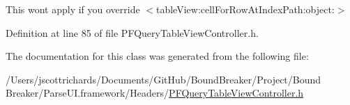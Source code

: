 This won\textquotesingle{}t apply if you override $<$table\+View\+:cell\+For\+Row\+At\+Index\+Path\+:object\+:$>$ 

Definition at line 85 of file P\+F\+Query\+Table\+View\+Controller.\+h.



The documentation for this class was generated from the following file\+:\begin{DoxyCompactItemize}
\item 
/\+Users/jscottrichards/\+Documents/\+Git\+Hub/\+Bound\+Breaker/\+Project/\+Bound Breaker/\+Parse\+U\+I.\+framework/\+Headers/\hyperlink{_p_f_query_table_view_controller_8h}{P\+F\+Query\+Table\+View\+Controller.\+h}\end{DoxyCompactItemize}
